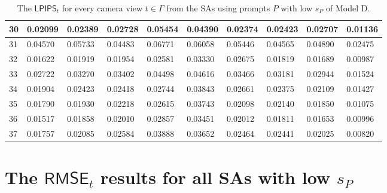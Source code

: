 \begin{table}[H]
{\begin{tabular}{|l|l|l|l|l|l|l|l|l|l|}
        30 & 0.02099 & 0.02389 & 0.02728 & 0.05454 & 0.04390 & 0.02374 & 0.02423 & 0.02707 & 0.01136 \\ \hline
        31 & 0.04570 & 0.05733 & 0.04483 & 0.06771 & 0.06058 & 0.05446 & 0.04565 & 0.04890 & 0.02475 \\ \hline
        32 & 0.01622 & 0.01919 & 0.01954 & 0.02581 & 0.03330 & 0.02675 & 0.01819 & 0.01689 & 0.00987 \\ \hline
        33 & 0.02722 & 0.03270 & 0.03402 & 0.04498 & 0.04616 & 0.03466 & 0.03181 & 0.02944 & 0.01524 \\ \hline
        34 & 0.01904 & 0.02423 & 0.02418 & 0.02744 & 0.03843 & 0.02661 & 0.02375 & 0.02109 & 0.01427 \\ \hline
        35 & 0.01790 & 0.01930 & 0.02218 & 0.02615 & 0.03743 & 0.02098 & 0.02140 & 0.01850 & 0.01075 \\ \hline
        36 & 0.01517 & 0.01858 & 0.02010 & 0.02857 & 0.03451 & 0.02012 & 0.01811 & 0.01653 & 0.00996 \\ \hline
        37 & 0.01757 & 0.02085 & 0.02584 & 0.03888 & 0.03652 & 0.02464 & 0.02441 & 0.02025 & 0.00820 \\ \hline
    \end{tabular}}
	\caption{The $ \mathsf{LPIPS}_t$ for every camera view $t \in \varGamma$ from the SAs using prompts $P$ with low $s_P$ of Model D.}
\end{table}


\section{The  $ \mathsf{RMSE}_t$ results for all SAs with low $s_P$}

